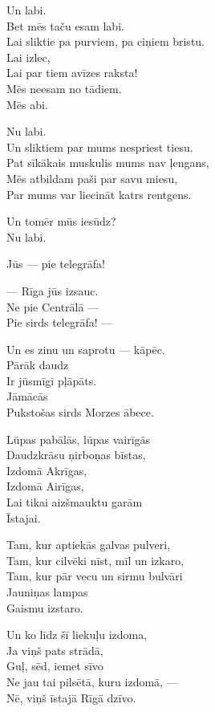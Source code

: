 \documentclass[14pt]{extarticle}
\begin{document}
Un labi.\\
Bet mēs taču esam labi.\\
Lai sliktie pa purviem, pa ciņiem bristu.\\
Lai izlec,\\
Lai par tiem avīzes raksta!\\
Mēs neesam no tādiem.\\
Mēs abi.

Nu labi.\\
Un sliktiem par mums nespriest tiesu.\\
Pat sīkākais muskulis mums nav ļengans,\\
Mēs atbildam paši par savu miesu,\\
Par mums var liecināt katrs rentgens.

Un tomēr mūs iesūdz?\\
Nu labi.


\newpage

{\large \sc Jūs --- pie telegrāfa!}

--- Rīga jūs izsauc.\\
Ne pie Centrālā ---\\
Pie sirds telegrāfa! ---

Un es zinu un saprotu --- kāpēc.\\
Pārāk daudz\\
Ir jūsmīgi pļāpāts.\\
Jāmācās\\
Pukstošas sirds Morzes ābece.

Lūpas pabālās, lūpas vairīgās\\
Daudzkrāsu ņirboņas bīstas,\\
Izdomā Akrīgas,\\
Izdomā Airīgas,\\
Lai tikai aizšmauktu garām\\
Īstajai.

Tam, kur aptiekās galvas pulveri,\\
Tam, kur cilvēki nīst, mīl un izkaro,\\
Tam, kur pār vecu un sirmu bulvāri\\
Jauniņas lampas\\
Gaismu izstaro.

Un ko līdz šī liekuļu izdoma,\\
Ja viņš pats strādā,\\
Guļ, sēd, iemet sīvo\\
Ne jau tai pilsētā, kuru izdomā, ---\\
Nē, viņš īstajā Rīgā dzīvo.
\end{document}
